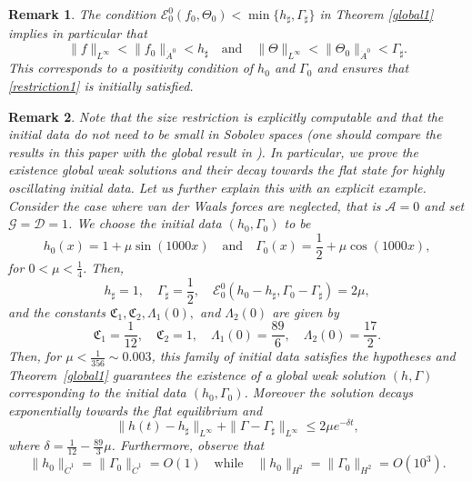 \documentclass[reqno,11pt]{amsart}
\newcommand{\bh}{h_\sharp}
\newcommand{\bG}{\Gamma_\sharp}
\newtheorem{remark}{Remark}
\begin{document}
\medskip

\begin{remark}
The condition $
\mathscr{E}^0_0(f_0,\Theta_0)<\min\{\bh,\bG\}
$ in Theorem \ref{global1} implies in particular that
\[
	\|f\|_{L^\infty}<\|f_0\|_{\dot A^0}<\bh\quad\mbox{and}\quad \|\Theta\|_{L^\infty}<\|\Theta_0\|_{\dot A^0}<\bG.
\]
This corresponds to a positivity condition of $h_0$ and $\Gamma_0$ and ensures that \eqref{restriction1} is initially satisfied.
\end{remark}

\begin{remark}
Note that the size restriction is explicitly computable and that the initial data do not need to be small in Sobolev spaces (one should compare the results in this paper with the global result in \cite{bruellwell}). In particular, we prove the existence global weak solutions and their decay towards the flat state for highly oscillating initial data. Let us further explain this with an explicit example. Consider the case where van der Waals forces are neglected, that is $\mathcal A=0$ and set $\mathcal G=\mathcal D=1$. We choose the initial data $(h_0,\Gamma_0)$ to be
$$
h_0(x)=1+\mu\sin(1000x)\quad \mbox{and}\quad \Gamma_0(x)=\frac{1}{2}+\mu\cos(1000x),
$$
for $0<\mu< \frac{1}{4}$. Then, 
$$
\bh=1,\quad\bG=\frac{1}{2},\quad\mathscr{E}^0_0(h_0-\bh,\Gamma_0-\bG)=2\mu,
$$
and the constants $\mathfrak{C}_1,\mathfrak{C}_2,\Lambda_1(0),$ and $\Lambda_2(0)$ are given by
$$
\mathfrak{C}_1=\frac{1}{12},\quad\mathfrak{C}_2=1,\quad \Lambda_1(0)= \frac{89}{6},\quad \Lambda_2(0)=\frac{17}{2}.
$$
Then, for $\mu<\frac{1}{356}\sim 0.003$, this family of initial data satisfies the hypotheses and Theorem~\ref{global1} guarantees the existence of a global weak solution $(h,\Gamma)$ corresponding to the initial data $(h_0,\Gamma_0)$. Moreover the solution decays exponentially towards the flat equilibrium and
\[
\|h(t)-\bh\|_{L^\infty}+\|\Gamma-\bG\|_{L^\infty}\leq 2\mu e^{-\delta t},
\]
where $\delta =\frac{1}{12}-\frac{89}{3}\mu$. Furthermore, observe that
$$
\|h_0\|_{\dot{C}^1}=\|\Gamma_0\|_{\dot{C}^1}=O(1) \quad \mbox{while}\quad \|h_0\|_{H^2}=\|\Gamma_0\|_{H^2}=O(10^3).
$$
\end{remark}


\medskip
\end{document}
